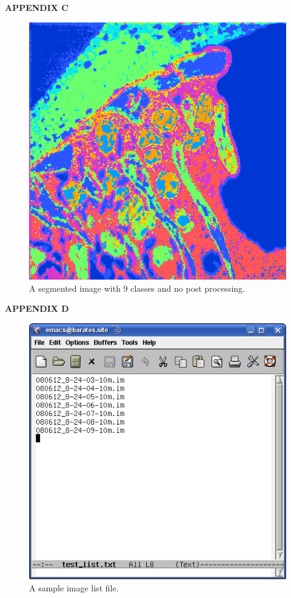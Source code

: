 \documentclass{article}
\begin{document}
\newpage
\begin{center}\LARGE{\textbf{APPENDIX C}}\end{center} 
\vfill
\begin{figure}[h]
\centering
\includegraphics[scale=0.5]{seg_lechene_94p.png}
\caption{A segmented image with 9 classes and no post processing. }
\end{figure}
\vfill


\newpage
\begin{center}\LARGE{\textbf{APPENDIX D}}\end{center} 
\vfill
\begin{figure}[h]
\centering
\includegraphics[scale=0.75]{snapshot_ImageList.png}
\caption{A sample image list file.}
\end{figure}
\vfill
\end{document}
